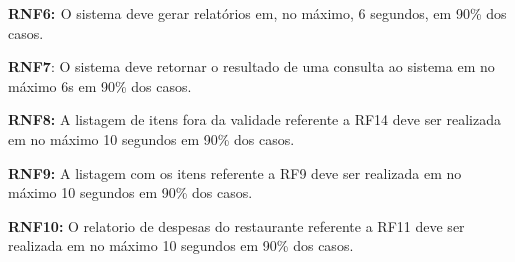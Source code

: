 {
\textbf{\textcolor[rgb]{0.078431375,0.09411765,0.13725491}{RNF6: }}\textcolor[rgb]{0.078431375,0.09411765,0.13725491}{O
sistema deve gerar relatórios em, no máximo, 6 segundos, em 90\% dos casos.}}

{
\textbf{\textcolor[rgb]{0.078431375,0.09411765,0.13725491}{RNF7}}\textcolor[rgb]{0.078431375,0.09411765,0.13725491}{: O
sistema deve retornar o resultado de uma consulta ao sistema em no máximo 6s em 90\% dos casos.}}

{
\textbf{\textcolor[rgb]{0.078431375,0.09411765,0.13725491}{RNF8:}}\textcolor[rgb]{0.078431375,0.09411765,0.13725491}{ A
listagem de itens fora da validade referente} a RF14 dev\textcolor[rgb]{0.078431375,0.09411765,0.13725491}{e ser
realizada em no máximo 10 segundos em 90\% dos casos.}}

{
\textbf{\textcolor[rgb]{0.078431375,0.09411765,0.13725491}{RNF9:}}\textcolor[rgb]{0.078431375,0.09411765,0.13725491}{ A
listagem com os itens referente} a RF9\textcolor[rgb]{0.078431375,0.09411765,0.13725491}{ deve ser realizada em no
máximo 10 segundos em 90\% dos casos.}}

{
\textbf{\textcolor[rgb]{0.078431375,0.09411765,0.13725491}{RNF10:}}\textcolor[rgb]{0.078431375,0.09411765,0.13725491}{ O
relatorio de despesas do restaurante referent}e a RF11\textcolor[rgb]{1.0,0.6,0.0}{
}\textcolor[rgb]{0.078431375,0.09411765,0.13725491}{deve ser realizada em no máximo 10 segundos em 90\% dos casos.}}


\bigskip